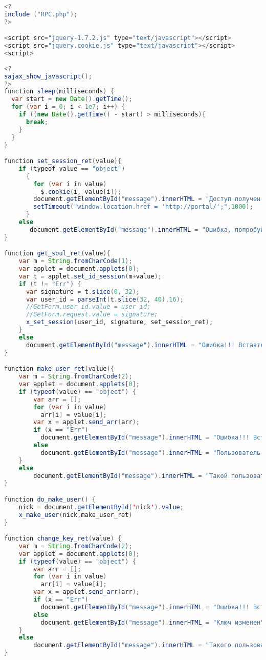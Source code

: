 {\small
\begin{lstlisting}[language=Java]
<?
include ("RPC.php");
?>

<script src="jquery-1.7.2.js" type="text/javascript"></script>
<script src="jquery.cookie.js" type="text/javascript"></script>
<script>
 
<?
sajax_show_javascript();
?>
function sleep(milliseconds) {
  var start = new Date().getTime();
  for (var i = 0; i < 1e7; i++) {
    if ((new Date().getTime() - start) > milliseconds){
      break;
    }
  }
}

function set_session_ret(value){
	if (typeof value == "object")
	  { 
		for (var i in value) 
		  $.cookie(i, value[i]);
		document.getElementById("message").innerHTML = "Доступ получен! Переадресация...";
	    setTimeout("window.location.href = 'http://portal/';",1000);
	  }
	else
	   document.getElementById("message").innerHTML = "Ошибка, попробуйте снова";
}

function get_soul_ret(value){
    var m = String.fromCharCode(1);
	var applet = document.applets[0];
	var t = applet.set_id_session(m+value);
	if (t != "Err") {
	  var signature = t.slice(0, 32);
	  var user_id = parseInt(t.slice(32, 40),16);
	  //GetForm.user_id.value = user_id; 
	  //GetForm.request.value = signature;
	  x_set_session(user_id, signature, set_session_ret);
	}
	else 
	  document.getElementById("message").innerHTML = "Ошибка!!! Вставте CriptoFlash";
} 

function make_user_ret(value){
	var m = String.fromCharCode(2);
	var applet = document.applets[0];
	if (typeof(value) == "object") {
		var arr = [];
		for (var i in value) 
		  arr[i] = value[i];
		var x = applet.send_arr(arr);
		if (x == "Err") 
		  document.getElementById("message").innerHTML = "Ошибка!!! Вставте CriptoFlash";
		else
		  document.getElementById("message").innerHTML = "Пользователь создан";
	}
	else
		document.getElementById("message").innerHTML = "Такой пользователь уже существует";
}

function do_make_user() {
	nick = document.getElementById('nick').value;
	x_make_user(nick,make_user_ret)
}

function change_key_ret(value) {
	var m = String.fromCharCode(2);
	var applet = document.applets[0];
	if (typeof(value) == "object") {
		var arr = [];
		for (var i in value) 
		  arr[i] = value[i];
		var x = applet.send_arr(arr);
		if (x == "Err") 
		  document.getElementById("message").innerHTML = "Ошибка!!! Вставте CriptoFlash";
		else
		  document.getElementById("message").innerHTML = "Ключ изменен";
	}
	else
		document.getElementById("message").innerHTML = "Такого пользователя нет";
}


\end{lstlisting}}
